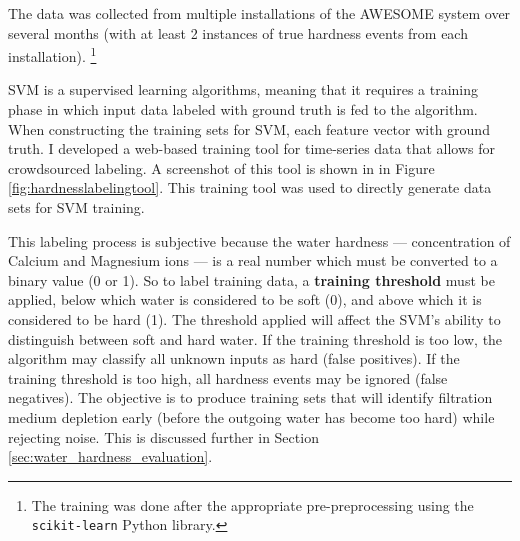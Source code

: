 The data was collected from multiple installations of the AWESOME \cite{AWESOME} system over several months (with at least 2 instances of true hardness events from each installation).
 \footnote{The training was done after the appropriate pre-preprocessing using the \texttt{scikit-learn} Python library.}

SVM is a supervised learning algorithms, meaning that it requires a training phase in which input data labeled with ground truth is fed to the algorithm.
 When constructing the training sets for SVM, each feature vector with ground truth.
 I developed a web-based training tool for time-series data that allows for crowdsourced labeling.
 A screenshot of this tool is shown in in Figure \ref{fig:hardnesslabelingtool}.
 This training tool was used to directly generate data sets for SVM training.

This labeling process is subjective because the water hardness --- concentration of Calcium and Magnesium ions --- is a real number which must be converted to a binary value (0 or 1).
 So to label training data, a \textbf{training threshold} must be applied, below which water is considered to be soft (0), and above which it is considered to be hard (1).
 The threshold applied will affect the SVM's ability to distinguish between soft and hard water.
 If the training threshold is too low, the algorithm may classify all unknown inputs as hard (false positives).
 If the training threshold is too high, all hardness events may be ignored (false negatives).
 The objective is to produce training sets that will identify filtration medium depletion early (before the outgoing water has become too hard) while rejecting noise.
 This is discussed further in Section \ref{sec:water_hardness_evaluation}.

